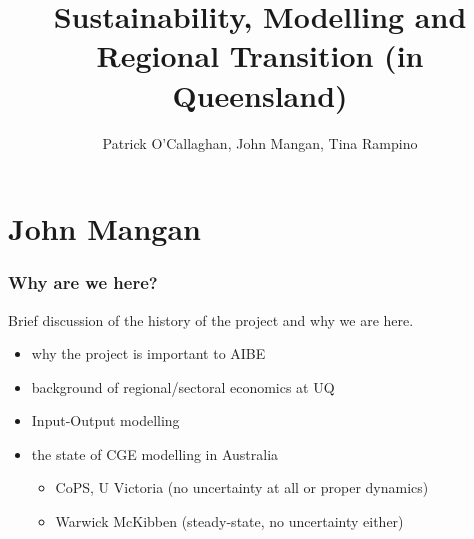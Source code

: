 \documentclass[handout,english]{beamer}
\title{Sustainability, Modelling and Regional Transition (in Queensland)}
\author[Patrick O'Callaghan]{Patrick O'Callaghan, John Mangan, Tina Rampino}
\institute{AIBE, The University of Queensland\\
\today}
\date{}
\begin{document}
\maketitle
\section{John Mangan}
\begin{frame}
  \frametitle{Why are we here?}
  Brief discussion of the history of the project and why we are here.
  \begin{itemize}
    \item why the project is important to AIBE\\
    \item background of regional/sectoral economics at UQ\\
    \item Input-Output modelling\\
    \item the state of CGE modelling in Australia\\
    \begin{itemize}
      \item CoPS, U Victoria (no uncertainty at all or proper dynamics)\\
      \item Warwick McKibben (steady-state, no uncertainty either)\\
    \end{itemize}
  \end{itemize}
\end{frame}
\end{document}
